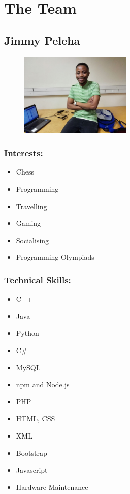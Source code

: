 \section{The Team}

\subsection{Jimmy Peleha}
\begin{figure}[h]
			\center
			\includegraphics[width=200px]{images/Jimmy.jpg}
\end{figure}

\subsubsection{Interests:}
\begin{itemize}
	\item Chess
	\item Programming
	\item Travelling
	\item Gaming
	\item Socialising
	\item Programming Olympiads
\end{itemize}

\subsubsection{Technical Skills:}
\begin{itemize}
	\item C++
	\item Java
	\item Python
	\item C\#
	\item MySQL
	\item npm and Node.js
	\item PHP
	\item HTML, CSS
	\item XML
	\item Bootstrap
	\item Javascript
	\item Hardware Maintenance 
\end{itemize}


